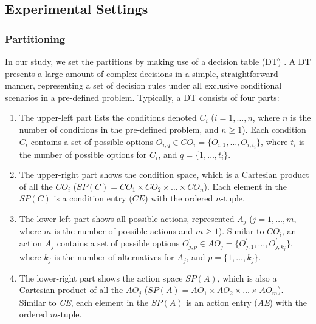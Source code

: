 \documentclass[10pt,journal,compsoc]{IEEEtran}
\begin{document}
\subsection{Experimental Settings}
\label{sec:settings}

\subsubsection{Partitioning}
\label{sec:partition}

In our study, we set the partitions by making use of a decision table (DT) \cite{gettys1986if}.
A DT presents a large amount of complex decisions in a simple, straightforward manner, representing a set of decision rules under all exclusive conditional scenarios in a pre-defined problem.
Typically, a DT consists of four parts:

\begin{enumerate}
	\item
	The upper-left part lists the conditions denoted $C_i$ ($i = 1, \ldots, n$, where $n$ is the number of conditions in the pre-defined problem,
    and $n \ge 1$).
	Each condition $C_i$ contains a set of possible options $O_{i,q} \in CO_i = \{O_{i,1}, \ldots, O_{i,t_{i}}\}$, where $t_i$ is the number of
    possible options for $C_i$, and $q = \{1,\ldots,t_i\}$.
	
	\item
	The upper-right part shows the condition space, which is a Cartesian product of all the $CO_i$	($SP(C) = CO_1 \times CO_2 \times \ldots \times CO_n$).
	Each element in the $SP(C)$ is a condition entry ($CE$) with the ordered $n$-tuple.
	
	\item
	The lower-left part shows all possible actions, represented $A_j$ ($j = 1, \ldots, m$, where $m$ is the number of possible actions and $m \ge 1$).
	Similar to $CO_i$, an action $A_j$ contains a set of possible options $O_{j,p}^{'} \in AO_j = \{O_{j,1}^{'}, \ldots, O_{j,k_{j}}^{'}\}$, where $k_j$ is the number of alternatives for $A_j$, and $p = \{1,\ldots,k_j\}$.

	\item
	The lower-right part shows the action space $SP(A)$, which is also a Cartesian product of all the $AO_j$ ($SP(A) = AO_1 \times AO_2 \times \ldots \times AO_m$).
	Similar to \emph{CE}, each element in the $SP(A)$ is an action entry (\emph{AE}) with the ordered $m$-tuple.
	
\end{enumerate}
\end{document}
